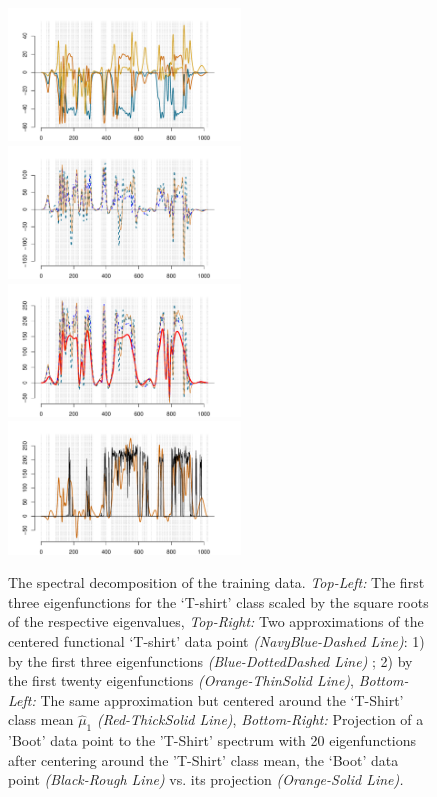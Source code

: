 \begin{enumerate}[leftmargin=0.2cm]
\begin{figure}[t!]
  \includegraphics[width=0.55\textwidth]{figures/Fig8TopLeft.pdf}\hspace{-10mm}
    \includegraphics[width=0.55\textwidth]{figures/Fig8TopRight.pdf}\hspace{-5mm}\\
  \includegraphics[width=0.55\textwidth]{figures/Fig8BottomLeft.pdf}\hspace{-10mm}
  \includegraphics[width=0.55\textwidth]{figures/Fig8BottomRight.pdf}\hspace{-5mm}
  \caption{\footnotesize The spectral decomposition of the training data. 
  \emph {Top-Left:} The first three eigenfunctions for the `T-shirt' class scaled by the square roots of the respective eigenvalues, 
  \emph{ Top-Right:} Two approximations of the centered functional `T-shirt' data point \emph{ (NavyBlue-Dashed Line)}: 1) by the first three eigenfunctions \emph{ (Blue-DottedDashed Line)} ; 2) by the first twenty eigenfunctions \emph{ (Orange-ThinSolid Line)},
  \emph{ Bottom-Left:}
  The same approximation but centered around the `T-Shirt' class mean $\hat \mu_1$ \emph{ (Red-ThickSolid Line)},
  \emph{ Bottom-Right:}
  Projection of a 'Boot' data point to the 'T-Shirt' spectrum with 20 eigenfunctions after centering around the 'T-Shirt' class mean, the  `Boot' data point \emph{ (Black-Rough Line)} vs. its projection \emph{ (Orange-Solid Line).}
}
  \label{KS_EigenFunctions}
  \end{figure}


\end{enumerate}
